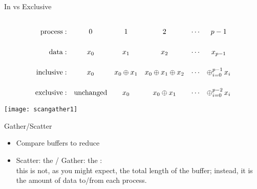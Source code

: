 \begin{numberedframe}{In vs Exclusive}
  \def\strut{\vrule height 25pt width 0pt\relax}
\[
\begin{array}{rccccc}
  \mathrm{process:}\strut
      &0&1&2&\cdots&p-1\\
  \mathrm{data:}\strut
      &x_0&x_1&x_2&\cdots&x_{p-1}\\
  \mathrm{inclusive:}\strut
      &x_0&x_0\oplus x_1&x_0\oplus x_1\oplus x_2&\cdots&\mathop\oplus_{i=0}^{p-1} x_i\\
  \mathrm{exclusive:}\strut
      &\mathrm{unchanged}&x_0&x_0\oplus x_1&\cdots&\mathop\oplus_{i=0}^{p-2} x_i\\
\end{array}
\]
\end{numberedframe}

\begin{mpl}
  \addtocounter{slidecount}{-1}
\end{mpl}


\begin{exerciseframe}[scangather]
  \label{fig:scanints}
  
  \texttt{[image: scangather1]}
\end{exerciseframe}


\begin{mpl}
  \addtocounter{slidecount}{-1}
\end{mpl}
\begin{mpl}
  \addtocounter{slidecount}{-1}
\end{mpl}

\begin{numberedframe}{Gather/Scatter}
\begin{itemize}
\item Compare buffers to reduce
\item Scatter: the  / Gather: the :\\
this is not, as you might expect, the total length of the
buffer; instead, it is the amount of data to/from each process.
\end{itemize}
\end{numberedframe}

